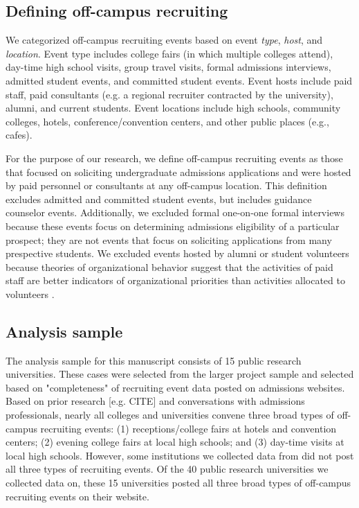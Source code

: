 \documentclass[twoside]{article}
\begin{document}
\subsection*{Defining off-campus recruiting}

We categorized off-campus recruiting events based on event \textit{type}, \textit{host}, and \textit{location}. Event type includes college fairs (in which multiple colleges attend), day-time high school visits, group travel visits, formal admissions interviews, admitted student events, and committed student events. Event hosts include paid staff, paid consultants (e.g. a regional recruiter contracted by the university), alumni, and current students. Event locations include high schools, community colleges, hotels, conference/convention centers, and other public places (e.g., cafes).  

For the purpose of our research, we define off-campus recruiting events as those that focused on soliciting undergraduate admissions applications and were hosted by paid personnel or consultants at any off-campus location. This definition excludes admitted and committed student events, but includes guidance counselor events. Additionally, we excluded formal one-on-one formal interviews because these events focus on determining admissions eligibility of a particular prospect; they are not events that focus on soliciting applications from many prespective students. We excluded events hosted by alumni or student volunteers because theories of organizational behavior suggest that the activities of paid staff are better indicators of organizational priorities than activities allocated to volunteers \citep{RN531}.

\subsection*{Analysis sample}

The analysis sample for this manuscript consists of 15 public research universities. These cases were selected from the larger project sample and selected based on "completeness" of recruiting event data posted on admissions websites.  Based on prior research [e.g. CITE] and conversations with admissions professionals, nearly all colleges and universities convene three broad types of off-campus recruiting events: (1) receptions/college fairs at hotels and convention centers; (2) evening college fairs at local high schools; and (3) day-time visits at local high schools. However, some institutions we collected data from did not post all three types of recruiting events. Of the 40 public research universities we collected data on, these 15 universities posted all three broad types of off-campus recruiting events on their website. 
\end{document}
